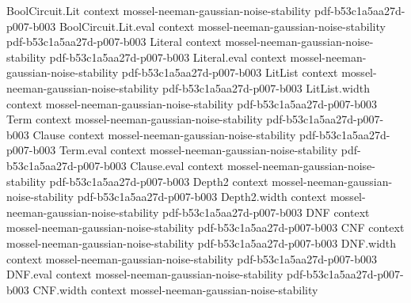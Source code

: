 \begin{theorem}
\label{BooleanAnalysis.GaussianSpace.MaxCut.goemans_williamson}
\leanok
{}
\proofstep
  {BoolCircuit.Lit}
  {context}
  {mossel-neeman-gaussian-noise-stability}
  {pdf-b53c1a5aa27d-p007-b003}
\proofstep
  {BoolCircuit.Lit.eval}
  {context}
  {mossel-neeman-gaussian-noise-stability}
  {pdf-b53c1a5aa27d-p007-b003}
\proofstep
  {Literal}
  {context}
  {mossel-neeman-gaussian-noise-stability}
  {pdf-b53c1a5aa27d-p007-b003}
\proofstep
  {Literal.eval}
  {context}
  {mossel-neeman-gaussian-noise-stability}
  {pdf-b53c1a5aa27d-p007-b003}
\proofstep
  {LitList}
  {context}
  {mossel-neeman-gaussian-noise-stability}
  {pdf-b53c1a5aa27d-p007-b003}
\proofstep
  {LitList.width}
  {context}
  {mossel-neeman-gaussian-noise-stability}
  {pdf-b53c1a5aa27d-p007-b003}
\proofstep
  {Term}
  {context}
  {mossel-neeman-gaussian-noise-stability}
  {pdf-b53c1a5aa27d-p007-b003}
\proofstep
  {Clause}
  {context}
  {mossel-neeman-gaussian-noise-stability}
  {pdf-b53c1a5aa27d-p007-b003}
\proofstep
  {Term.eval}
  {context}
  {mossel-neeman-gaussian-noise-stability}
  {pdf-b53c1a5aa27d-p007-b003}
\proofstep
  {Clause.eval}
  {context}
  {mossel-neeman-gaussian-noise-stability}
  {pdf-b53c1a5aa27d-p007-b003}
\proofstep
  {Depth2}
  {context}
  {mossel-neeman-gaussian-noise-stability}
  {pdf-b53c1a5aa27d-p007-b003}
\proofstep
  {Depth2.width}
  {context}
  {mossel-neeman-gaussian-noise-stability}
  {pdf-b53c1a5aa27d-p007-b003}
\proofstep
  {DNF}
  {context}
  {mossel-neeman-gaussian-noise-stability}
  {pdf-b53c1a5aa27d-p007-b003}
\proofstep
  {CNF}
  {context}
  {mossel-neeman-gaussian-noise-stability}
  {pdf-b53c1a5aa27d-p007-b003}
\proofstep
  {DNF.width}
  {context}
  {mossel-neeman-gaussian-noise-stability}
  {pdf-b53c1a5aa27d-p007-b003}
\proofstep
  {DNF.eval}
  {context}
  {mossel-neeman-gaussian-noise-stability}
  {pdf-b53c1a5aa27d-p007-b003}
\proofstep
  {CNF.width}
  {context}
  {mossel-neeman-gaussian-noise-stability}

\end{theorem}
